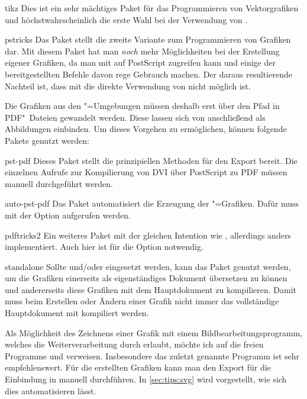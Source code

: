 \begin{packages}
\item[tikz]
  Dies ist ein sehr mächtiges Paket für das Programmieren von Vektorgrafiken 
  und höchstwahrscheinlich die erste Wahl bei der Verwendung von 
  .
\item[pstricks]
  Das Paket  stellt die zweite Variante zum Programmieren 
  von Grafiken dar. Mit diesem Paket hat man \emph{noch} mehr Möglichkeiten bei 
  der Erstellung eigener Grafiken, da man mit  auf 
  PostScript zugreifen kann und einige der bereitgestellten Befehle davon rege 
  Gebrauch machen. Der daraus resultierende Nachteil ist, dass mit 
   die direkte Verwendung von  nicht 
  möglich ist.
  
  Die Grafiken aus den "=Umgebungen müssen deshalb erst 
  über den Pfad 
  in PDF"~Dateien gewandelt werden. Diese lassen sich von  
  anschließend als Abbildungen einbinden. Um dieses Vorgehen zu ermöglichen, 
  können folgende Pakete genutzt werden:
  \begin{packages}
  \item[pst-pdf]
    Dieses Paket stellt die prinzipiellen Methoden für den Export bereit. Die 
    einzelnen Aufrufe zur Kompilierung von DVI über PostScript zu PDF müssen 
    manuell durchgeführt werden.
  \item[auto-pst-pdf]
    Das Paket automatisiert die Erzeugung der "=Grafiken. 
    Dafür muss  mit der Option  
    aufgerufen werden.
  \item[pdftricks2]
    Ein weiteres Paket mit der gleichen Intention wie , 
    allerdings anders implementiert. Auch hier ist für  die 
    Option  notwendig.
  \end{packages}
\item[standalone]
  Sollte  und/oder  eingesetzt werden, kann 
  das Paket  genutzt werden, um die Grafiken einerseits 
  als eigenständiges Dokument übersetzen zu können und andererseits diese 
  Grafiken mit dem Hauptdokument zu kompilieren. Damit muss beim Erstellen oder 
  Ändern einer Grafik nicht immer das vollständige Hauptdokument mit kompiliert 
  werden.
\end{packages}
%
Als Möglichkeit des Zeichnens einer Grafik mit einem Bildbearbeitungsprogramm, 
welches die Weiterverarbeitung durch  erlaubt, möchte ich auf die 
freien Programme  und  verweisen. 
Insbesondere das zuletzt genannte Programm ist sehr empfehlenswert. Für die 
erstellten Grafiken kann man den Export für die Einbindung in  
manuell durchführen. In \autoref{sec:tips:svg} wird vorgestellt, wie sich dies 
automatisieren lässt.

